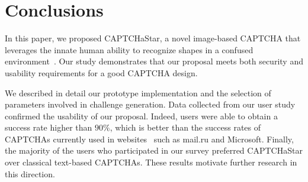 \documentclass[conference]{IEEEtran}
\begin{document}
\section{Conclusions}
\label{conclusions}
In this paper, we proposed CAPTCHaStar, a novel image-based CAPTCHA that leverages the innate human ability to recognize shapes in a confused environment~\cite{kanizsa1979organization}.
Our study demonstrates that our proposal meets both security and usability requirements for a good CAPTCHA design.

We described in detail our prototype implementation and the selection of parameters involved in challenge generation. Data collected from our user study confirmed the usability of our proposal.
Indeed, users were able to obtain a success rate higher than $90\%$, which is better than the success rates of CAPTCHAs currently used in websites~\cite{bursztein2010good} such as mail.ru and Microsoft.
Finally, the majority of the users who participated in our survey preferred CAPTCHaStar over classical text-based CAPTCHAs.
These results motivate further research in this direction.

\begin{comment}
\begin{figure}[ht!]
\centering
\begin{subfigure}{.48\textwidth}
\texttt{[image: attack\_success\_tollerance25\_method\_new]}
\caption{Success rate.}
\label{fig:successRateML}
\end{subfigure}

\begin{subfigure}{.48\textwidth}
\texttt{[image: attack\_time\_tollerance25\_method\_new]}
\caption{Average execution time.}
\label{fig:timeML}
\end{subfigure}

\caption{Success rate and average execution time for machine learning-based attacks, varying the tile size parameter ($\omega$).}
\label{fig:MLSuccess}

\end{figure}
\end{comment}
\end{document}
